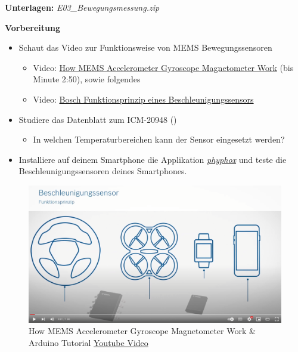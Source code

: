 \documentclass[
  11pt,
  a4paperpaper,
  oneside, openany  ,captions=tableheading
]{scrbook}
\providecommand{\tightlist}{%
  \setlength{\itemsep}{0pt}\setlength{\parskip}{0pt}}
\theoremstyle{definition}
\theoremstyle{remark}
\begin{document}
\textbf{Unterlagen:} \emph{ E03\_Bewegungsmessung.zip}

\textbf{Vorbereitung}

\begin{itemize}
\tightlist
\item
  Schaut das Video zur Funktionsweise von MEMS Bewegungssensoren

  \begin{itemize}
  \tightlist
  \item
    Video:
    \href{https://www.youtube.com/embed/eqZgxR6eRjo?si=u28t9yfD4BLPeYGd}{How
    MEMS Accelerometer Gyroscope Magnetometer Work} (bis Minute 2:50),
    sowie folgendes
  \item
    Video:
    \href{https://www.youtube.com/embed/swCTbz5sIQM?si=Uga2sPKfiQW7EO6z}{Bosch
    Funktionsprinzip eines Beschleunigungssensors}
  \end{itemize}
\item
  Studiere das Datenblatt zum ICM-20948
  ()

  \begin{itemize}
  \tightlist
  \item
    In welchen Temperaturbereichen kann der Sensor eingesetzt werden?
  \end{itemize}
\item
  Installiere auf deinem Smartphone die Applikation
  \emph{\href{https://phyphox.org}{phyphox}} und teste die
  Beschleunigungssensoren deines Smartphones.
\end{itemize}

\begin{figure}[H]

{\centering \includegraphics{images/youtube_bosch_beschleunigungssensor.png}

}

\caption{How MEMS Accelerometer Gyroscope Magnetometer Work \& Arduino
Tutorial
\href{https://www.youtube.com/embed/swCTbz5sIQM?si=Uga2sPKfiQW7EO6z}{Youtube
Video}}

\end{figure}%
\end{document}
